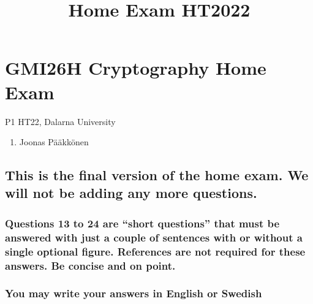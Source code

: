 \documentclass[11pt]{article}
\title{Home Exam HT2022}
\providecommand{\tightlist}{%
      \setlength{\itemsep}{0pt}\setlength{\parskip}{0pt}}
\begin{document}
    
    \maketitle
    
    

    
    \hypertarget{gmi26h-cryptography-home-exam}{%
\section{GMI26H Cryptography Home
Exam}\label{gmi26h-cryptography-home-exam}}

    P1 HT22, Dalarna University

\begin{enumerate}
\def\labelenumi{(\alph{enumi})}
\setcounter{enumi}{2}
\tightlist
\item
  Joonas Pääkkönen
\end{enumerate}

\hypertarget{this-is-the-final-version-of-the-home-exam.-we-will-not-be-adding-any-more-questions.}{%
\subsection{This is the final version of the home exam. We will not be
adding any more
questions.}\label{this-is-the-final-version-of-the-home-exam.-we-will-not-be-adding-any-more-questions.}}

\hypertarget{questions-13-to-24-are-short-questions-that-must-be-answered-with-just-a-couple-of-sentences-with-or-without-a-single-optional-figure.-references-are-not-required-for-these-answers.-be-concise-and-on-point.}{%
\subsubsection{Questions 13 to 24 are ``short questions'' that must be
answered with just a couple of sentences with or without a single
optional figure. References are not required for these answers. Be
concise and on
point.}\label{questions-13-to-24-are-short-questions-that-must-be-answered-with-just-a-couple-of-sentences-with-or-without-a-single-optional-figure.-references-are-not-required-for-these-answers.-be-concise-and-on-point.}}

\hypertarget{you-may-write-your-answers-in-english-or-swedish}{%
\subsubsection{You may write your answers in English or
Swedish}\label{you-may-write-your-answers-in-english-or-swedish}}
\end{document}
